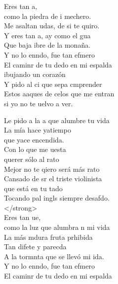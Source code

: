 \begin{cancion}%
	Eres tan a, \\
	como la piedra de i mechero.\\
	Me asaltan udas, de si te quiro.\\
	Y eres tan a, ay como el gua \\
	Que baja ibre de la monaña.\\
	Y no lo enndo, fue tan efmero \\
	El caminr de tu dedo en mi espalda \\
	ibujando un corazón\\
	Y pido al ci que sepa cmprender\\
	Estos aaques de celos que me entran\\
	si yo no te uelvo a ver.\\
	\begin{chorus}%
	Le pido a la a que alumbre tu vida\\
	La mía hace yatiempo \\
que yace encendida.\\
	Con lo que me uesta \\
querer sólo al rato\\
	Mejor no te qiero será más rato\\
	Cansado de sr el triste violinista \\
	que está en tu tado\\
	Tocando pal ingls siempre desafdo. \\
 </strong>\\
	Eres tan ue, \\
	como la luz que alumbra n mi vida\\
	La más mdura fruta prhibida\\
	Tan difete y parecda\\
	A la tormnta que se llevó mi ida.\\
	Y no lo enndo, fue tan efmero \\
	El caminr de tu dedo en mi espalda \\

\end{chorus}
\end{cancion}
